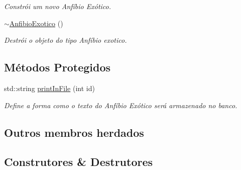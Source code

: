 \begin{DoxyCompactItemize}
\begin{DoxyCompactList}\small\item\em Constrói um novo Anfíbio Exótico. \end{DoxyCompactList}\item 
\mbox{\label{classAnfibioExotico_a2615151a98a1713a0d8c65d97bccd813}} 
\hyperlink{classAnfibioExotico_a2615151a98a1713a0d8c65d97bccd813}{$\sim$\+Anfibio\+Exotico} ()
\begin{DoxyCompactList}\small\item\em Destrói o objeto do tipo Anfíbio exotico. \end{DoxyCompactList}\end{DoxyCompactItemize}
\subsection*{Métodos Protegidos}
\begin{DoxyCompactItemize}
\item 
std\+::string \hyperlink{classAnfibioExotico_a08d9debec54258a0f43c8c503dfb23d0}{print\+In\+File} (int id)
\begin{DoxyCompactList}\small\item\em Define a forma como o texto do Anfíbio Exótico será armazenado no banco. \end{DoxyCompactList}\end{DoxyCompactItemize}
\subsection*{Outros membros herdados}


\subsection{Construtores \& Destrutores}
\mbox{\label{classAnfibioExotico_a9c6535c2c202776c0837e4b917589dd6}} 
